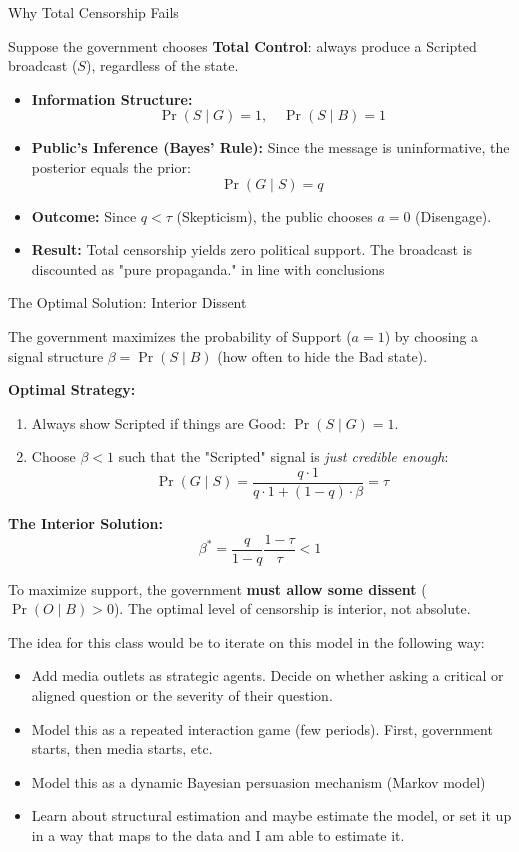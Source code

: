 \documentclass[11pt]{article}
\begin{document}
Why Total Censorship Fails

Suppose the government chooses \textbf{Total Control}: always produce a Scripted broadcast ($S$), regardless of the state.

\begin{itemize}
    \item \textbf{Information Structure:}
    \[ \Pr(S \mid G) = 1, \quad \Pr(S \mid B) = 1 \]
    
    \item \textbf{Public's Inference (Bayes' Rule):}
    Since the message is uninformative, the posterior equals the prior:
    \[ \Pr(G \mid S) = q \]
    
    \item \textbf{Outcome:}
    Since $q < \tau$ (Skepticism), the public chooses $a=0$ (Disengage).
    
    \item \textbf{Result:} 
    Total censorship yields zero political support. The broadcast is discounted as "pure propaganda." in line with \citep{Censor-Pratt-AER} conclusions
\end{itemize}


The Optimal Solution: Interior Dissent

The government maximizes the probability of Support ($a=1$) by choosing a signal structure $\beta = \Pr(S \mid B)$ (how often to hide the Bad state).

\textbf{Optimal Strategy:}
\begin{enumerate}
    \item Always show Scripted if things are Good: $\Pr(S \mid G) = 1$.
    \item Choose $\beta < 1$ such that the "Scripted" signal is \textit{just credible enough}:
    \[ \Pr(G \mid S) = \frac{q \cdot 1}{q \cdot 1 + (1-q) \cdot \beta} = \tau \]
\end{enumerate}

\textbf{The Interior Solution:}
\[ \beta^* = \frac{q}{1-q} \frac{1-\tau}{\tau} < 1 \]

 To maximize support, the government \textbf{must allow some dissent} ($\Pr(O \mid B) > 0$). The optimal level of censorship is interior, not absolute.


The idea for this class would be to iterate on this model in the following way: 

\begin{itemize}
    \item Add media outlets as strategic agents. Decide on whether asking a critical or aligned question or the severity of their question.
    \item Model this as a repeated interaction game (few periods). First, government starts, then media starts, etc.
    \item Model this as a dynamic Bayesian persuasion mechanism (Markov model)
    \item Learn about structural estimation and maybe estimate the model, or set it up in a way that maps to the data and I am able to estimate it.
\end{itemize}





\clearpage
\small

\typeout{}

\singlespacing



\end{document}
